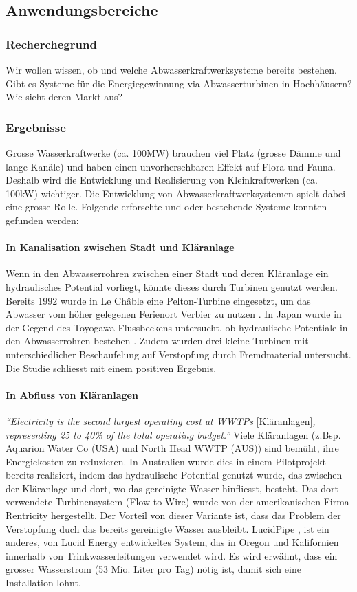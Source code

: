 \subsection{Anwendungsbereiche}
\subsubsection{Recherchegrund}
Wir wollen wissen, ob und welche Abwasserkraftwerksysteme bereits bestehen. Gibt es  Systeme für die Energiegewinnung via Abwasserturbinen in Hochhäusern? Wie sieht deren Markt aus?
\subsubsection{Ergebnisse}
Grosse Wasserkraftwerke (ca. 100\si{MW}) brauchen viel Platz (grosse Dämme und lange Kanäle) und haben einen unvorhersehbaren Effekt auf Flora und Fauna. Deshalb wird die Entwicklung und Realisierung von Kleinkraftwerken (ca. 100\si{kW}) wichtiger. Die Entwicklung von Abwasserkraftwerksystemen spielt dabei eine grosse Rolle. Folgende erforschte und oder bestehende Systeme konnten gefunden werden:
\paragraph{In Kanalisation zwischen Stadt und Kläranlage}
Wenn in den Abwasserrohren zwischen einer Stadt und deren Kläranlage ein hydraulisches Potential vorliegt, könnte dieses durch Turbinen genutzt werden. Bereits 1992 wurde in Le Châble eine Pelton-Turbine eingesetzt, um das Abwasser vom höher gelegenen Ferienort Verbier zu nutzen \cite{waterworld}.
In Japan wurde in der Gegend des Toyogawa-Flussbeckens untersucht, ob hydraulische Potentiale in den Abwasserrohren bestehen \cite{uchiyama2016feasibility}. Zudem wurden drei kleine Turbinen mit unterschiedlicher Beschaufelung auf Verstopfung durch Fremdmaterial untersucht. Die Studie schliesst mit einem positiven Ergebnis.
\paragraph{In Abfluss von Kläranlagen}
\textit{``Electricity is the second largest operating cost at WWTPs} [Kläranlagen]\textit{, representing 25 to 40\% of the total operating budget.''} \cite[2]{NYSERDA}
Viele Kläranlagen (z.Bsp. Aquarion Water Co (USA) und North Head WWTP (AUS)) sind bemüht, ihre Energiekosten zu reduzieren. In Australien wurde dies in einem Pilotprojekt bereits realisiert, indem das hydraulische Potential genutzt wurde, das zwischen der Kläranlage und dort, wo das gereinigte Wasser hinfliesst, besteht. \cite{powermag} Das dort verwendete Turbinensystem (Flow-to-Wire) \cite{rentricity} wurde von der amerikanischen Firma Rentricity hergestellt. Der Vorteil von dieser Variante ist, dass das Problem der Verstopfung duch das bereits gereinigte Wasser ausbleibt.
LucidPipe \cite[4]{LUCIDPIPE}, ist ein anderes, von Lucid Energy entwickeltes System, das in Oregon und Kalifornien innerhalb von Trinkwasserleitungen verwendet wird. Es wird erwähnt, dass ein grosser Wasserstrom (53 Mio. Liter pro Tag) nötig ist, damit sich eine Installation lohnt. \cite[4]{LUCIDPIPE}
